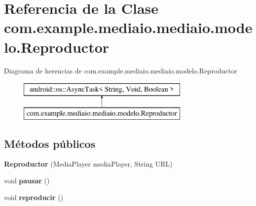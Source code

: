 \hypertarget{classcom_1_1example_1_1mediaio_1_1mediaio_1_1modelo_1_1_reproductor}{}\section{Referencia de la Clase com.\+example.\+mediaio.\+mediaio.\+modelo.\+Reproductor}
\label{classcom_1_1example_1_1mediaio_1_1mediaio_1_1modelo_1_1_reproductor}
Diagrama de herencias de com.\+example.\+mediaio.\+mediaio.\+modelo.\+Reproductor\begin{figure}[H]
\begin{center}
\leavevmode
\includegraphics[height=2.000000cm]{classcom_1_1example_1_1mediaio_1_1mediaio_1_1modelo_1_1_reproductor}
\end{center}
\end{figure}
\subsection*{Métodos públicos}
\begin{DoxyCompactItemize}
\item 
\mbox{\label{classcom_1_1example_1_1mediaio_1_1mediaio_1_1modelo_1_1_reproductor_a3bd2f8f3e81df059d21999915df3dba6}} 
{\bfseries Reproductor} (Media\+Player media\+Player, String U\+RL)
\item 
\mbox{\label{classcom_1_1example_1_1mediaio_1_1mediaio_1_1modelo_1_1_reproductor_ac08be9a63140296c37156480969bec20}} 
void {\bfseries pausar} ()
\item 
\mbox{\label{classcom_1_1example_1_1mediaio_1_1mediaio_1_1modelo_1_1_reproductor_a95c5f1d9790d034b63c65afb7618df97}} 
void {\bfseries reproducir} ()
\end{DoxyCompactItemize}
